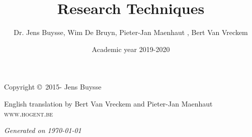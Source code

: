 \documentclass{hogent-report}
\title{Research Techniques}
\author{Dr. Jens Buysse, Wim {De Bruyn}, Pieter-Jan Maenhaut , Bert {Van Vreckem}}
\date{Academic year 2019-2020}
\begin{document}


\newpage

\thispagestyle{empty}

\vspace*{20cm}

\noindent Copyright \copyright\ 2015-{\the\year} Jens Buysse %

\noindent English translation by Bert Van Vreckem and Pieter-Jan Maenhaut\\

\noindent \textsc{www.hogent.be} %

\noindent \textit{Generated on \today} %



\usechapterimagefalse
\tableofcontents %

\cleardoublepage %

\def\R{\mathbb{R}}














%
%
%
%
%
%
%
%
%
\end{document}

